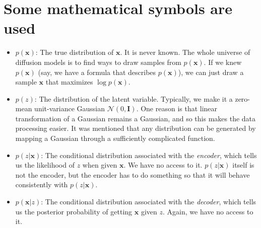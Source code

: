 \section{Some mathematical symbols are used}
\begin{itemize}
    \item $p(\mathbf{x})$: The true distribution of $\mathbf{x}$. It is never known. The whole universe of diffusion models is to find ways to draw samples from $p(\mathbf{x})$. If we knew $p(\mathbf{x})$ (say, we have a formula that describes $p(\mathbf{x})$), we can just draw a sample $\mathbf{x}$ that maximizes $\log p(\mathbf{x})$.
    
    \item $p(z)$: The distribution of the latent variable. Typically, we make it a zero-mean unit-variance Gaussian $\mathcal{N}(0, \mathbf{I})$. One reason is that linear transformation of a Gaussian remains a Gaussian, and so this makes the data processing easier. It was mentioned that any distribution can be generated by mapping a Gaussian through a sufficiently complicated function.
    
    \item $p(z|\mathbf{x})$: The conditional distribution associated with the \textit{encoder}, which tells us the likelihood of $z$ when given $\mathbf{x}$. We have no access to it. $p(z|\mathbf{x})$ itself is not the encoder, but the encoder has to do something so that it will behave consistently with $p(z|\mathbf{x})$.
    
    \item $p(\mathbf{x}|z)$: The conditional distribution associated with the \textit{decoder}, which tells us the posterior probability of getting $\mathbf{x}$ given $z$. Again, we have no access to it.
\end{itemize}

